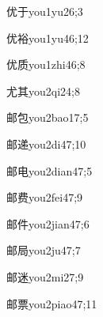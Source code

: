 \begin{verbete}{优于}{you1yu2}{6;3}
\end{verbete}

\begin{verbete}{优裕}{you1yu4}{6;12}
\end{verbete}

\begin{verbete}{优质}{you1zhi4}{6;8}
\end{verbete}

\begin{verbete}{尤其}{you2qi2}{4;8}
\end{verbete}

\begin{verbete}{邮包}{you2bao1}{7;5}
\end{verbete}

\begin{verbete}{邮递}{you2di4}{7;10}
\end{verbete}

\begin{verbete}{邮电}{you2dian4}{7;5}
\end{verbete}

\begin{verbete}{邮费}{you2fei4}{7;9}
\end{verbete}

\begin{verbete}{邮件}{you2jian4}{7;6}
\end{verbete}

\begin{verbete}{邮局}{you2ju4}{7;7}
\end{verbete}

\begin{verbete}{邮迷}{you2mi2}{7;9}
\end{verbete}

\begin{verbete}{邮票}{you2piao4}{7;11}
\end{verbete}

